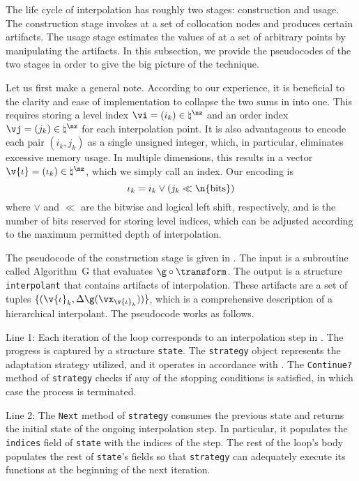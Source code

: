 The life cycle of interpolation has roughly two stages: construction and usage.
The construction stage invokes \g at a set of collocation nodes and produces
certain artifacts. The usage stage estimates the values of \g at a set of
arbitrary points by manipulating the artifacts. In this subsection, we provide
the pseudocodes of the two stages in order to give the big picture of the
technique.

Let us first make a general note. According to our experience, it is beneficial
to the clarity and ease of implementation to collapse the two sums in
 into one. This requires storing a level index $\vi = (i_k)
\in \natural^\nz$ and an order index $\vj = (j_k) \in \natural^\nz$ for each
interpolation point. It is also advantageous to encode each pair $(i_k, j_k)$ as
a single unsigned integer, which, in particular, eliminates excessive memory
usage. In multiple dimensions, this results in a vector $\v{\iota} = (\iota_k)
\in \natural^\nz$, which we simply call an index. Our encoding is
\[
  \iota_k = i_k \lor (j_k \ll \n{\mathrm{bits}})
\]
where $\lor$ and $\ll$ are the bitwise  and logical left shift,
respectively, and  is the number of bits reserved for storing
level indices, which can be adjusted according to the maximum permitted depth of
interpolation.

The pseudocode of the construction stage is given in .
The input is a subroutine called Algorithm~G that evaluates $\g \circ
\transform$. The output is a structure \texttt{interpolant} that contains
artifacts of interpolation. These artifacts are a set of tuples $\{
(\v{\iota}_k, \Delta\g(\vx_{\v{\iota}_k})) \}$, which is a comprehensive
description of a hierarchical interpolant. The pseudocode works as follows.

Line 1: Each iteration of the loop corresponds to an interpolation step \ls in
. The progress is captured by a structure \texttt{state}. The
\texttt{strategy} object represents the adaptation strategy utilized, and it
operates in accordance with . The \texttt{Continue?}
method of \texttt{strategy} checks if any of the stopping conditions is
satisfied, in which case the process is terminated.

Line 2: The \texttt{Next} method of \texttt{strategy} consumes the previous
state and returns the initial state of the ongoing interpolation step. In
particular, it populates the \texttt{indices} field of \texttt{state} with the
indices of the step. The rest of the loop's body populates the rest of
\texttt{state}'s fields so that \texttt{strategy} can adequately execute its
functions at the beginning of the next iteration.

